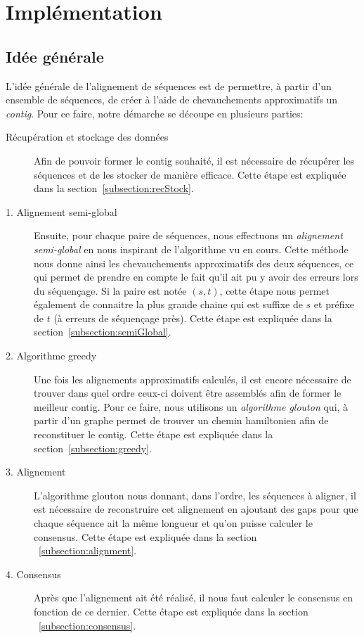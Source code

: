 \section{Implémentation}

\subsection{Idée générale}

	L'idée générale de l'alignement de séquences est de permettre, à partir d'un ensemble de séquences, de créer à l'aide de chevauchements approximatifs un \emph{contig}. Pour ce faire, notre démarche se découpe en plusieurs parties:

	\begin{description}
		\item[Récupération et stockage des données] Afin de pouvoir former le contig souhaité, il est nécessaire de récupérer les séquences et de les stocker de manière efficace. Cette étape est expliquée dans la section~\ref{subsection:recStock}.

		\item[1. Alignement semi-global] Ensuite, pour chaque paire de séquences,
			nous effectuons un \emph{alignement semi-global} en nous inspirant
			de l'algorithme vu en cours. Cette méthode nous donne ainsi
			les chevauchements approximatifs des deux séquences, ce qui permet de
			prendre en compte le fait qu'il ait pu y avoir des erreurs lors du
			séquençage. Si la paire est notée $(s, t)$, cette étape nous permet également de connaitre la plus
			grande chaine qui est suffixe de $s$ et préfixe de $t$ (à erreurs de séquençage près). Cette étape
			est expliquée dans la section~\ref{subsection:semiGlobal}.

		\item[2. Algorithme greedy] Une fois les alignements approximatifs
			calculés, il est encore nécessaire de trouver dans quel ordre
			ceux-ci doivent être assemblés afin de former le meilleur contig.
			Pour ce faire, nous utilisons un \emph{algorithme glouton} qui, à
			partir d'un graphe permet de trouver un chemin hamiltonien afin de
			reconstituer le contig. Cette étape est expliquée dans la
			section~\ref{subsection:greedy}.

		\item[3. Alignement]
			L'algorithme glouton nous donnant, dans l'ordre, les séquences à
			aligner, il est nécessaire de reconstruire cet alignement en
			ajoutant des gaps pour que chaque séquence ait la même longueur et
			qu'on puisse calculer le consensus. Cette étape est expliquée dans
			la section ~\ref{subsection:alignment}.

		\item[4. Consensus]
			Après que l'alignement ait été réalisé, il nous faut calculer le
			consensus en fonction de ce dernier. Cette étape est expliquée dans
			la section ~\ref{subsection:consensus}.
	\end{description}

